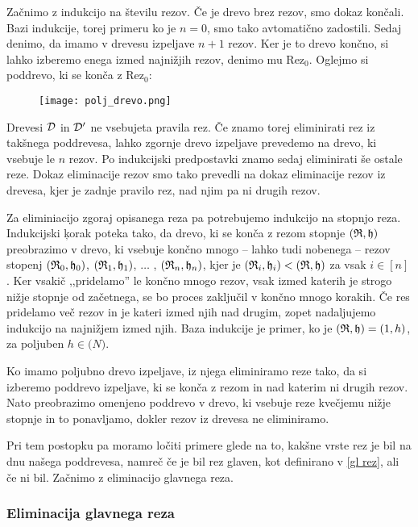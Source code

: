 Začnimo z indukcijo na številu rezov. Če je drevo brez rezov, smo dokaz končali. Bazi indukcije, torej primeru ko je $n=0$, smo tako avtomatično zadostili. Sedaj denimo, da imamo v drevesu izpeljave $n+1$ rezov. Ker je to drevo končno, si lahko izberemo enega izmed najnižjih rezov, denimo mu Rez$_0$. Oglejmo si poddrevo, ki se konča z Rez$_0$:
\begin{figure}[h]
    \centering \texttt{[image: polj\_drevo.png]}
\end{figure}

Drevesi $\mathcal{D}$ in $\mathcal{D}'$ ne vsebujeta pravila rez. Če znamo torej eliminirati rez iz takšnega poddrevesa, lahko zgornje drevo izpeljave prevedemo na drevo, ki vsebuje le $n$ rezov. Po indukcijski predpostavki znamo sedaj eliminirati še ostale reze. Dokaz eliminacije rezov smo tako prevedli na dokaz eliminacije rezov iz drevesa, kjer je zadnje pravilo rez, nad njim pa ni drugih rezov.

Za eliminiacijo zgoraj opisanega reza pa potrebujemo indukcijo na stopnjo reza. Indukcijski ķorak poteka tako, da drevo, ki se konča z rezom stopnje $(\mathfrak{R},\mathfrak{h})$ preobrazimo v drevo, ki vsebuje končno mnogo -- lahko tudi nobenega -- rezov stopenj $(\mathfrak{R}_0,\mathfrak{h}_0)$, $(\mathfrak{R}_1,\mathfrak{h}_1)$, $\ldots$ , $(\mathfrak{R}_n,\mathfrak{h}_n)$, kjer je $(\mathfrak{R}_i,\mathfrak{h}_i) < (\mathfrak{R},\mathfrak{h})$ za vsak $i\in[n]$. Ker vsakič ,,pridelamo'' le končno mnogo rezov, vsak izmed katerih je strogo nižje stopnje od začetnega, se bo proces zaključil v končno mnogo korakih. Če res pridelamo več rezov in je kateri izmed njih nad drugim, zopet nadaljujemo indukcijo na najnižjem izmed njih. Baza indukcije je primer, ko je $(\mathfrak{R},\mathfrak{h}) = (1,h)$, za poljuben $h\in\mathbb(N)$.

\begin{summary}
    Ko imamo poljubno drevo izpeljave, iz njega eliminiramo reze tako, da si izberemo poddrevo izpeljave, ki se konča z rezom in nad katerim ni drugih rezov. Nato preobrazimo omenjeno poddrevo v drevo, ki vsebuje reze kvečjemu nižje stopnje in to ponavljamo, dokler rezov iz drevesa ne eliminiramo.
\end{summary}

Pri tem postopku pa moramo ločiti primere glede na to, kakšne vrste rez je bil na dnu našega poddrevesa, namreč če je bil rez glaven, kot definirano v \ref{gl rez}, ali če ni bil. Začnimo z eliminacijo glavnega reza.

\subsubsection{Eliminacija glavnega reza} \label{gl rez vezniki}


